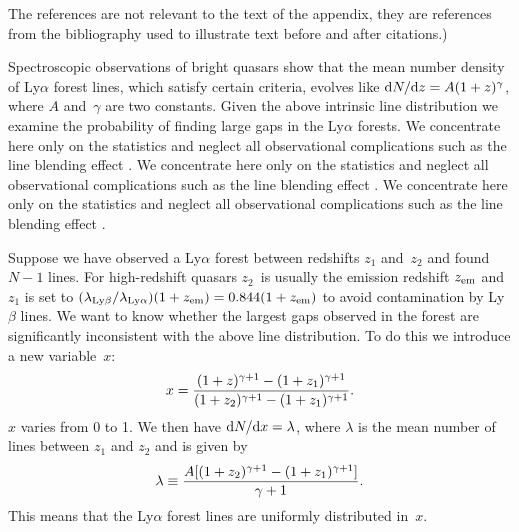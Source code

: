 \documentclass[useAMS,usenatbib]{biom}
\begin{document}
The references are not relevant to the text of the
appendix, they are references from the bibliography used to
illustrate text before and after citations.)

Spectroscopic observations of bright quasars show that the mean
number density of Ly$\alpha$ forest lines, which satisfy certain
criteria, evolves like ${\mathrm{d}}N/{\mathrm{d}}z=A(1+z)^\gamma$, where
$A$ and~$\gamma$ are two constants.  Given the above intrinsic
line distribution we examine the probability of finding large gaps
in the Ly$\alpha$ forests.  We concentrate here only on the
statistics and neglect all observational complications such as the
line blending effect \citep[see][for example]{b11}. We concentrate here only on the
statistics and neglect all observational complications such as the
line blending effect \citep[see][for example]{b11}.\vadjust{\vfill\pagebreak}
 We concentrate here only on the
statistics and neglect all observational complications such as the
line blending effect \citep[see][for example]{b11}. 

Suppose we have observed a Ly$\alpha$ forest between redshifts $z_1$
and~$z_2$ and found $N-1$ lines.  For high-redshift quasars $z_2$~is
usually the emission redshift $z_{{\mathrm{em}}}$ and $z_1$ is set to
$(\lambda_{{\mathrm{Ly}}\beta}/\lambda_{{\mathrm{Ly}}\alpha})(1+z_{{\mathrm{em}}})=0.844
(1+z_{{\mathrm{em}}})$ to avoid contamination by Ly$\beta$ lines.  We
want to know whether the largest gaps observed in the forest are
significantly inconsistent with the above line distribution.  To do
this we introduce a new variable~$x$:\vspace*{1.5pt}
%
\[
x={(1+z)^{\gamma+1}-(1+z_1)^{\gamma+1} \over
     (1+z_2)^{\gamma+1}-(1+z_1)^{\gamma+1}}.
\]
\vskip1.5pt%
$x$ varies from 0 to 1.  We then have ${\mathrm{d}}N/{\mathrm{d}}x=\lambda$,
where $\lambda$ is the mean number of lines between $z_1$ and $z_2$
and is given by
%
\[%
\lambda\equiv{A[(1+z_2)^{\gamma+1}-(1+z_1)^{\gamma+1}]\over\gamma+1}.
\]
%
This means that the Ly$\alpha$ forest lines are uniformly
distributed in~$x$.
%
\label{lastpage}
\end{document}
